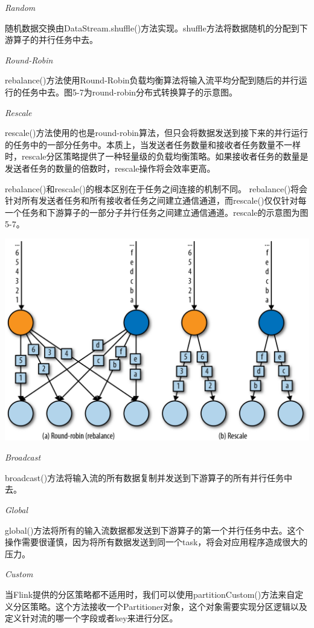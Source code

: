 \documentclass[cn,11pt,chinese]{elegantbook}
\begin{document}
\emph{Random}

随机数据交换由DataStream.shuffle()方法实现。shuffle方法将数据随机的分配到下游算子的并行任务中去。

\emph{Round-Robin}

rebalance()方法使用Round-Robin负载均衡算法将输入流平均分配到随后的并行运行的任务中去。图5-7为round-robin分布式转换算子的示意图。

\emph{Rescale}

rescale()方法使用的也是round-robin算法，但只会将数据发送到接下来的并行运行的任务中的一部分任务中。本质上，当发送者任务数量和接收者任务数量不一样时，rescale分区策略提供了一种轻量级的负载均衡策略。如果接收者任务的数量是发送者任务的数量的倍数时，rescale操作将会效率更高。

rebalance()和rescale()的根本区别在于任务之间连接的机制不同。
rebalance()将会针对所有发送者任务和所有接收者任务之间建立通信通道，而rescale()仅仅针对每一个任务和下游算子的一部分子并行任务之间建立通信通道。rescale的示意图为图5-7。

\includegraphics{images/spaf_0507.png}

\emph{Broadcast}

broadcast()方法将输入流的所有数据复制并发送到下游算子的所有并行任务中去。

\emph{Global}

global()方法将所有的输入流数据都发送到下游算子的第一个并行任务中去。这个操作需要很谨慎，因为将所有数据发送到同一个task，将会对应用程序造成很大的压力。

\emph{Custom}

当Flink提供的分区策略都不适用时，我们可以使用partitionCustom()方法来自定义分区策略。这个方法接收一个Partitioner对象，这个对象需要实现分区逻辑以及定义针对流的哪一个字段或者key来进行分区。
\end{document}
